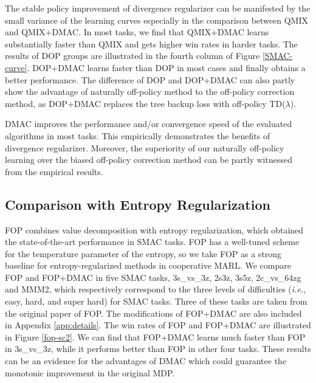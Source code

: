 \documentclass{article}
\begin{document}
The stable policy improvement of divergence regularizer can be manifested by the small variance of the learning curves especially in the comparison between QMIX and QMIX+DMAC. In most tasks, we find that QMIX+DMAC learns substantially faster than QMIX and gets higher win rates in harder tasks.  
The results of DOP groups are illustrated in the fourth column of Figure \ref{SMAC-curve}. DOP+DMAC learns faster than DOP in most cases and finally obtains a better performance. The difference of DOP and DOP+DMAC can also partly show the advantage of naturally off-policy method to the off-policy correction method, as DOP+DMAC replaces the tree backup loss with off-policy TD($\lambda$).

DMAC improves the performance and/or convergence speed of the evaluated algorithms in most tasks. This empirically demonstrates the benefits of divergence regularizer. Moreover, the superiority of our naturally off-policy learning over the biased off-policy correction method can be partly witnessed from the empirical results.

\subsection{Comparison with Entropy Regularization}



FOP \citep{FOP} combines value decomposition with entropy regularization, which obtained the state-of-the-art performance in SMAC tasks. FOP has a well-tuned scheme for the temperature parameter of the entropy, so we take FOP as a strong baseline for entropy-regularized methods in cooperative MARL. We compare FOP and FOP+DMAC in five SMAC tasks, 3s\_vs\_3z, 2s3z, 3s5z, 2c\_vs\_64zg and MMM2, which respectively correspond to the three levels of difficulties (\textit{i.e.}, easy, hard, and super hard) for SMAC tasks. Three of these tasks are taken from the original paper of FOP. The modifications of FOP+DMAC are also included in Appendix \ref{app:details}. The win rates of FOP and FOP+DMAC are illustrated in Figure \ref{fop-sc2}. We can find that FOP+DMAC learns much faster than FOP in 3s\_vs\_3z, while it performs better than FOP in other four tasks. 
These results can be an evidence for the advantages of DMAC which could guarantee the monotonic improvement in the original MDP. 
\end{document}
